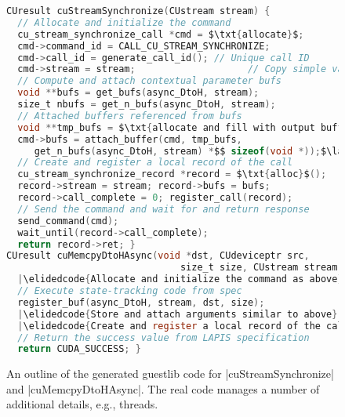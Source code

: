 
\begin{figure}
\begin{lstlisting}[language=C,columns=flexible,mathescape,belowskip=0em,aboveskip=0em,basicstyle={\scriptsize\ttfamily}]
CUresult cuStreamSynchronize(CUstream stream) {
  // Allocate and initialize the command
  cu_stream_synchronize_call *cmd = $\txt{allocate}$;
  cmd->command_id = CALL_CU_STREAM_SYNCHRONIZE;
  cmd->call_id = generate_call_id(); // Unique call ID
  cmd->stream = stream;                    // Copy simple value
  // Compute and attach contextual parameter bufs
  void **bufs = get_bufs(async_DtoH, stream);
  size_t nbufs = get_n_bufs(async_DtoH, stream);
  // Attached buffers referenced from bufs
  void **tmp_bufs = $\txt{allocate and fill with output buffer sentinal}$;$\label{line:bufs-start}$
  cmd->bufs = attach_buffer(cmd, tmp_bufs, 
     get_n_bufs(async_DtoH, stream) *$$ sizeof(void *));$\label{line:bufs-end}$
  // Create and register a local record of the call
  cu_stream_synchronize_record *record = $\txt{alloc}$();
  record->stream = stream; record->bufs = bufs;
  record->call_complete = 0; register_call(record);
  // Send the command and wait for and return response
  send_command(cmd);
  wait_until(record->call_complete);
  return record->ret; }
CUresult cuMemcpyDtoHAsync(void *dst, CUdeviceptr src, 
                               size_t size, CUstream stream) {
  |\elidedcode{Allocate and initialize the command as above}|
  // Execute state-tracking code from spec
  register_buf(async_DtoH, stream, dst, size);
  |\elidedcode{Store and attach arguments similar to above}|
  |\elidedcode{Create and register a local record of the call, and send}|
  // Return the success value from LAPIS specification
  return CUDA_SUCCESS; }
\end{lstlisting}
\caption{An outline of the generated guestlib code for \spec|cuStreamSynchronize| and \spec|cuMemcpyDtoHAsync|. 
The real code manages a number of additional details, e.g., threads.
}
\label{fig:generated-code-outline-guest}
\vspace*{-0.5em}
\end{figure}
